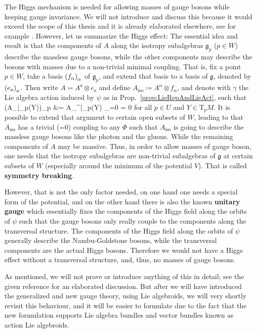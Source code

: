 The Higgs mechanism is needed for allowing masses of gauge bosons while keeping gauge invariance. We will not introduce and discuss this because it would exceed the scope of this thesis and it is already elaborated elsewhere, see for example \cite[\S 8; page 445ff.]{hamilton}. However, let us summarize the Higgs effect: The essential idea and result is that the components of $A$ along the isotropy subalgebras $\mathfrak{g}_p$ ($p \in W$) describe the massless gauge bosons, while the other components may describe the bosons with masses due to a non-trivial minimal coupling. That is, fix a point $p \in W$, take a basis $\mleft( f_\alpha \mright)_\alpha$ of $\mathfrak{g}_p$, and extend that basis to a basis of $\mathfrak{g}$, denoted by $\mleft( e_a \mright)_a$. Then write $A = A^a \otimes e_a$ and define $A_{\mathrm{iso}} \coloneqq A^\alpha \otimes f_\alpha$, and denote with $\gamma$ the Lie algebra action induced by $\psi$ as in Prop.~\ref{prop:LieRepAndLieAct}, such that
\bas
\gamma\bigl(A_{}|_p(Y)\bigr)_p
&=
A_{}^\alpha|_p(Y) \otimes {}_{=0}
=
0
\eas
for all $p \in U$ and $Y \in \mathrm{T}_pM$. It is possible to extend that argument to certain open subsets of $W$, leading to that $A_{\mathrm{iso}}$ has a trivial (=0) coupling to any $\Phi$ such that $A_{\mathrm{iso}}$ is going to describe the massless gauge bosons like the photon and the gluons. While the remaining components of $A$ may be massive. Thus, in order to allow masses of gauge boson, one needs that the isotropy subalgebras are non-trivial subalgebras of $\mathfrak{g}$ at certain subsets of $W$ (especially around the minimum of the potential $V$). That is called \textbf{symmetry breaking}.

However, that is not the only factor needed, on one hand one needs a special form of the potential, and on the other hand there is also the known \textbf{unitary gauge} which essentially fixes the components of the Higgs field along the orbits of $\psi$ such that the gauge bosons only really couple to the components along the transversal structure. The components of the Higgs field along the orbits of $\psi$ generally describe the Nambu-Goldstone bosons, while the transversal components are the actual Higgs bosons. Therefore we would not have a Higgs effect without a transversal structure, and, thus, no masses of gauge bosons.

As mentioned, we will not prove or introduce anything of this in detail; see the given reference for an elaborated discussion. But after we will have introduced the generalized and new gauge theory, using Lie algebroids, we will very shortly revisit this behaviour, and it will be easier to formulate due to the fact that the new formulation supports Lie algebra bundles and vector bundles known as action Lie algebroids.

